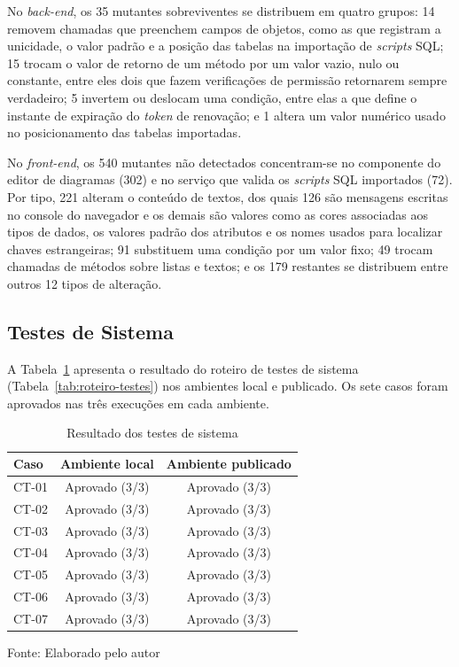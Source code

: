No \textit{back-end}, os 35 mutantes sobreviventes se distribuem em quatro grupos: 14 removem chamadas que preenchem campos de objetos, como as que registram a unicidade, o valor padrão e a posição das tabelas na importação de \textit{scripts} SQL; 15 trocam o valor de retorno de um método por um valor vazio, nulo ou constante, entre eles dois que fazem verificações de permissão retornarem sempre verdadeiro; 5 invertem ou deslocam uma condição, entre elas a que define o instante de expiração do \textit{token} de renovação; e 1 altera um valor numérico usado no posicionamento das tabelas importadas.

No \textit{front-end}, os 540 mutantes não detectados concentram-se no componente do editor de diagramas (302) e no serviço que valida os \textit{scripts} SQL importados (72). Por tipo, 221 alteram o conteúdo de textos, dos quais 126 são mensagens escritas no console do navegador e os demais são valores como as cores associadas aos tipos de dados, os valores padrão dos atributos e os nomes usados para localizar chaves estrangeiras; 91 substituem uma condição por um valor fixo; 49 trocam chamadas de métodos sobre listas e textos; e os 179 restantes se distribuem entre outros 12 tipos de alteração.

\subsection{Testes de Sistema}

A Tabela~\ref{tab:resultado-roteiro} apresenta o resultado do roteiro de testes de sistema (Tabela~\ref{tab:roteiro-testes}) nos ambientes local e publicado. Os sete casos foram aprovados nas três execuções em cada ambiente.

\begin{table}[H]
\centering
\renewcommand{\arraystretch}{1.4}
\caption{Resultado dos testes de sistema}
\label{tab:resultado-roteiro}
    \begin{tabular}{|l|c|c|}
    \hline
    \textbf{Caso} & \textbf{Ambiente local} & \textbf{Ambiente publicado} \\
    \hline
    CT-01 & Aprovado (3/3) & Aprovado (3/3) \\
    \hline
    CT-02 & Aprovado (3/3) & Aprovado (3/3) \\
    \hline
    CT-03 & Aprovado (3/3) & Aprovado (3/3) \\
    \hline
    CT-04 & Aprovado (3/3) & Aprovado (3/3) \\
    \hline
    CT-05 & Aprovado (3/3) & Aprovado (3/3) \\
    \hline
    CT-06 & Aprovado (3/3) & Aprovado (3/3) \\
    \hline
    CT-07 & Aprovado (3/3) & Aprovado (3/3) \\
    \hline
    \end{tabular}
\begin{center}
    {\small Fonte: Elaborado pelo autor}
\end{center}
\end{table}

